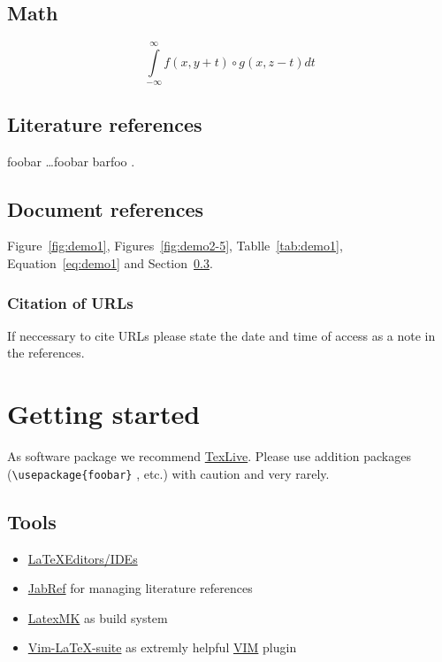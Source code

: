 \documentclass[a4paper,fontsize=12pt,toc=bib]{scrartcl}
\begin{document}
\subsection{Math}

\begin{equation}
    \int\limits_{-\infty}^{\infty}\! f(x,y+t)\circ g(x,z-t) dt
    \label{eq:demo1}
\end{equation}

\subsection{Literature references}

\blindtext \cite{Test2} foobar \ldots foobar \cite{Test1,Test4} barfoo \cite{Test3}.

\subsection{Document references}\label{subsec:references}

Figure~\ref{fig:demo1}, Figures~\ref{fig:demo2-5}, Tablle~\ref{tab:demo1}, Equation~\ref{eq:demo1} and Section~\ref{subsec:references}.

\subsubsection{Citation of URLs}

If neccessary to cite URLs please state the date and time of access as a note in the references.

\section{Getting started}

As software package we recommend \href{https://www.tug.org/texlive/}{TexLive}. Please use addition packages (\verb|\usepackage{foobar}| , etc.) with caution and very rarely.

\subsection{Tools}

\begin{itemize}
    \item \href{http://tex.stackexchange.com/questions/339/latex-editors-ides}{\LaTeX Editors/IDEs}
    \item \href{http://jabref.sourceforge.net/}{JabRef} for managing literature references
    \item \href{http://ctan.tug.org/tex-archive/support/latexmk/}{LatexMK} as build system
    \item \href{http://vim-latex.sourceforge.net/}{Vim-\LaTeX-suite} as extremly helpful \href{http://www.vim.org}{VIM} plugin
\end{itemize}
\end{document}

